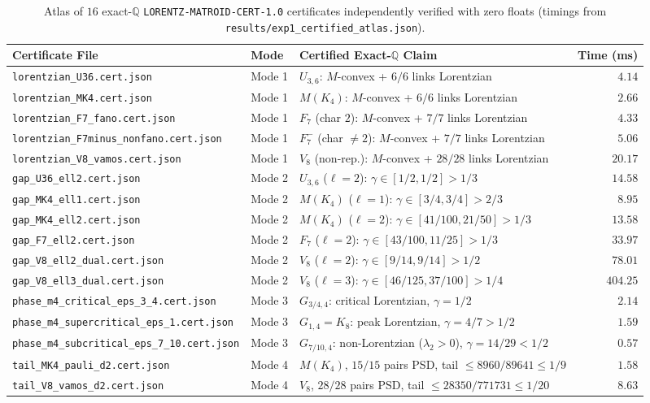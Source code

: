 \documentclass[11pt,a4paper]{article}
\theoremstyle{definition}
\theoremstyle{remark}
\newcommand{\QQ}{\mathbb{Q}}
\newcommand{\certschema}{\texttt{LORENTZ-MATROID-CERT-1.0}}
\begin{document}
\begin{table}[t]
\centering
\caption{Atlas of $16$ exact-$\QQ$ \certschema{} certificates independently verified with zero floats (timings from \texttt{results/exp1\_certified\_atlas.json}).}
\label{tab:atlas}
\scriptsize
\setlength{\tabcolsep}{4pt}
\begin{tabular}{@{}lllr@{}}
\toprule
Certificate File & Mode & Certified Exact-$\QQ$ Claim & Time (ms) \\
\midrule
\texttt{lorentzian\_U36.cert.json} & Mode 1 & $U_{3,6}$: $M$-convex + $6/6$ links Lorentzian & $4.14$ \\
\texttt{lorentzian\_MK4.cert.json} & Mode 1 & $M(K_4)$: $M$-convex + $6/6$ links Lorentzian & $2.66$ \\
\texttt{lorentzian\_F7\_fano.cert.json} & Mode 1 & $F_7$ (char $2$): $M$-convex + $7/7$ links Lorentzian & $4.33$ \\
\texttt{lorentzian\_F7minus\_nonfano.cert.json} & Mode 1 & $F_7^-$ (char $\neq 2$): $M$-convex + $7/7$ links Lorentzian & $5.06$ \\
\texttt{lorentzian\_V8\_vamos.cert.json} & Mode 1 & $V_8$ (non-rep.): $M$-convex + $28/28$ links Lorentzian & $20.17$ \\
\midrule
\texttt{gap\_U36\_ell2.cert.json} & Mode 2 & $U_{3,6}$ ($\ell=2$): $\gamma \in [1/2, 1/2] > 1/3$ & $14.58$ \\
\texttt{gap\_MK4\_ell1.cert.json} & Mode 2 & $M(K_4)$ ($\ell=1$): $\gamma \in [3/4, 3/4] > 2/3$ & $8.95$ \\
\texttt{gap\_MK4\_ell2.cert.json} & Mode 2 & $M(K_4)$ ($\ell=2$): $\gamma \in [41/100, 21/50] > 1/3$ & $13.58$ \\
\texttt{gap\_F7\_ell2.cert.json} & Mode 2 & $F_7$ ($\ell=2$): $\gamma \in [43/100, 11/25] > 1/3$ & $33.97$ \\
\texttt{gap\_V8\_ell2\_dual.cert.json} & Mode 2 & $V_8$ ($\ell=2$): $\gamma \in [9/14, 9/14] > 1/2$ & $78.01$ \\
\texttt{gap\_V8\_ell3\_dual.cert.json} & Mode 2 & $V_8$ ($\ell=3$): $\gamma \in [46/125, 37/100] > 1/4$ & $404.25$ \\
\midrule
\texttt{phase\_m4\_critical\_eps\_3\_4.cert.json} & Mode 3 & $G_{3/4,4}$: critical Lorentzian, $\gamma = 1/2$ & $2.14$ \\
\texttt{phase\_m4\_supercritical\_eps\_1.cert.json} & Mode 3 & $G_{1,4} = K_8$: peak Lorentzian, $\gamma = 4/7 > 1/2$ & $1.59$ \\
\texttt{phase\_m4\_subcritical\_eps\_7\_10.cert.json} & Mode 3 & $G_{7/10,4}$: non-Lorentzian ($\lambda_2>0$), $\gamma = 14/29 < 1/2$ & $0.57$ \\
\midrule
\texttt{tail\_MK4\_pauli\_d2.cert.json} & Mode 4 & $M(K_4)$, $15/15$ pairs PSD, tail $\le 8960/89641 \le 1/9$ & $1.58$ \\
\texttt{tail\_V8\_vamos\_d2.cert.json} & Mode 4 & $V_8$, $28/28$ pairs PSD, tail $\le 28350/771731 \le 1/20$ & $8.63$ \\
\bottomrule
\end{tabular}
\end{table}
\end{document}
